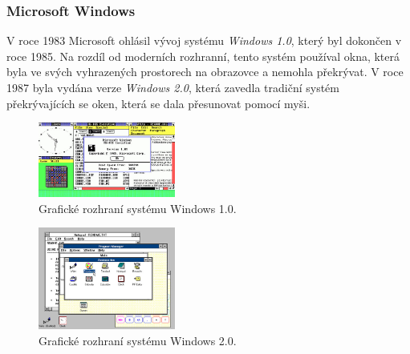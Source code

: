 \documentclass[11pt,twoside,a4paper]{book}
\begin{document}
\subsubsection{Microsoft Windows}
V roce 1983 Microsoft ohlásil vývoj systému \textit{Windows 1.0}, který byl dokončen v roce 1985. Na rozdíl od moderních rozhranní, tento systém používal okna, která byla ve svých vyhrazených prostorech na obrazovce a nemohla překrývat. V roce 1987 byla vydána verze \textit{Windows 2.0}, která zavedla tradiční systém překrývajících se oken, která se dala přesunovat pomocí myši.
\begin{figure}[!ht]
\begin{center}
  \includegraphics[width=0.4\textwidth]{win1}
\caption{{\label{fig:win1GUI}} Grafické rozhraní systému Windows 1.0.}
\end{center}
\end{figure}
\begin{figure}[!ht]
\begin{center}
  \includegraphics[width=0.4\textwidth]{win2}
\caption{{\label{fig:win2GUI}} Grafické rozhraní systému Windows 2.0.}
\end{center}
\end{figure}
\end{document}
